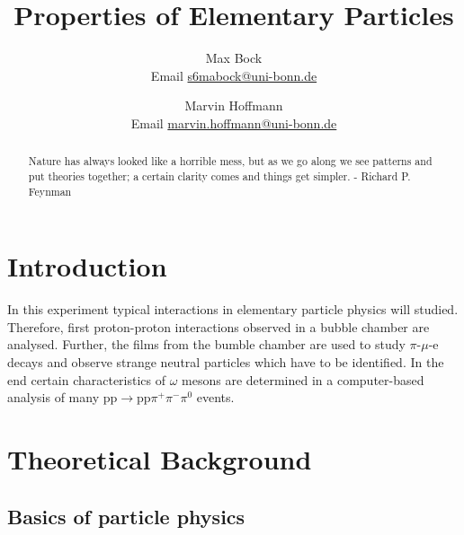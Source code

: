 \documentclass[10pt, a4paper, notitlepage, DIV=15]{scrartcl}
\title{Properties of Elementary Particles}
\author{Max Bock \\ Email \href{mailto:s6mabock@uni-bonn.de}{s6mabock@uni-bonn.de} 
	\and Marvin Hoffmann \\ Email \href{mailto:marvin.hoffmann@uni-bonn.de}{marvin.hoffmann@uni-bonn.de} }
\begin{document}
\maketitle
\begin{abstract}
	\Large
	Nature has always looked like a horrible mess, but as we go along we see patterns and put theories together; a certain clarity comes and things get simpler. - Richard P. Feynman \cite{feynman}
\end{abstract}
\tableofcontents
\newpage

\section{Introduction}
In this experiment typical interactions in elementary particle physics will studied. Therefore, first proton-proton interactions observed in a bubble chamber are analysed. Further, the films from the bumble chamber are used to study $\pi$-$\mu$-e decays and observe strange neutral particles which have to be identified. In the end certain characteristics of $\omega$ mesons are determined in a computer-based analysis of many $\text{pp}\rightarrow\text{pp}\pi^+\pi^-\pi^0$ events.
\section{Theoretical Background}
\subsection{Basics of particle physics}
\end{document}
